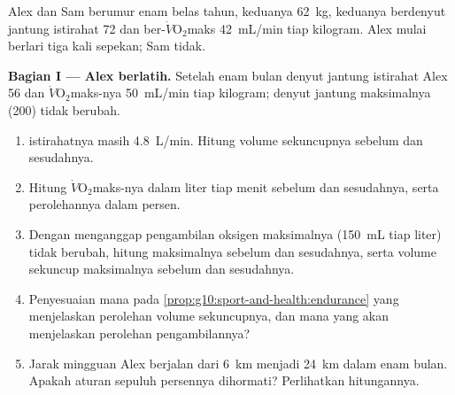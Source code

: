 \begin{problem}
\label{pb:g10:sport-and-health:1}
Alex dan Sam berumur enam belas tahun, keduanya \qty{62}{kg}, keduanya
berdenyut jantung istirahat 72 dan ber-$\dot V\!\mathrm{O_2}$maks
\qty{42}{mL/min} tiap kilogram. Alex mulai berlari tiga kali sepekan;
Sam tidak.

\medskip
\noindent\textbf{Bagian I --- Alex berlatih.}
Setelah enam bulan denyut jantung istirahat Alex 56 dan
$\dot V\!\mathrm{O_2}$maks-nya \qty{50}{mL/min} tiap kilogram; denyut
jantung maksimalnya (200) tidak berubah.
\begin{enumerate}
  \item {} istirahatnya masih \qty{4.8}{L/min}. Hitung
        volume sekuncupnya sebelum dan sesudahnya.
  \item Hitung $\dot V\!\mathrm{O_2}$maks-nya dalam liter tiap menit
        sebelum dan sesudahnya, serta perolehannya dalam persen.
  \item Dengan menganggap pengambilan oksigen maksimalnya
        (\qty{150}{mL} tiap liter) tidak berubah, hitung 
        maksimalnya sebelum dan sesudahnya, serta volume sekuncup
        maksimalnya sebelum dan sesudahnya.
  \item Penyesuaian mana pada
        \cref{prop:g10:sport-and-health:endurance} yang menjelaskan
        perolehan volume sekuncupnya, dan mana yang akan menjelaskan
        perolehan pengambilannya?
  \item Jarak mingguan Alex berjalan dari \qty{6}{km} menjadi
        \qty{24}{km} dalam enam bulan. Apakah aturan sepuluh persennya
        dihormati? Perlihatkan hitungannya.
\end{enumerate}


\end{problem}
